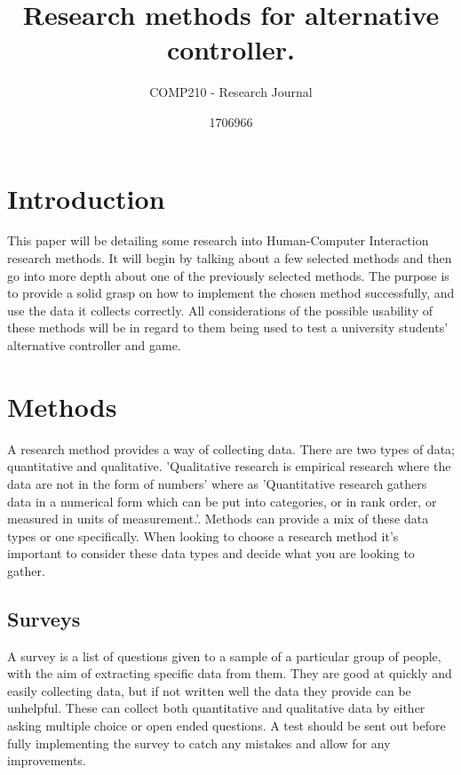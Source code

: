 \documentclass{scrartcl}
\title{Research methods for alternative controller.}
\subtitle{COMP210 - Research Journal}
\author{1706966}
\begin{document}
	
	\maketitle
	
	
	\section{Introduction}
		This paper will be detailing some research into Human-Computer Interaction research methods. It will begin by talking about a few selected methods and then go into more depth about one of the previously selected methods. The purpose is to provide a solid grasp on how to implement the chosen method successfully, and use the data it collects correctly. All considerations of the possible usability of these methods will be in regard to them being used to test a university students' alternative controller and game.
		
	\section{Methods}
		A research method provides a way of collecting data. There are two types of data; quantitative and qualitative. 'Qualitative research is empirical research where the data are not in the form of numbers'\cite{punch2013introduction} where as 'Quantitative research gathers data in a numerical form which can be put into categories, or in rank order, or measured in units of measurement.'\cite{simplePsych1}. Methods can provide a mix of these data types or one specifically. When looking to choose a research method it's important to consider these data types and decide what you are looking to gather.

	\subsection{Surveys}
		A survey is a list of questions given to a sample of a particular group of people, with the aim of extracting specific data from them. They are good at quickly and easily collecting data, but if not written well the data they provide can be unhelpful\cite{litwin1995measure}. These can collect both quantitative and qualitative data by either asking multiple choice or open ended questions. A test should be sent out before fully implementing the survey to catch any mistakes and allow for any improvements. 
		
\end{document}
